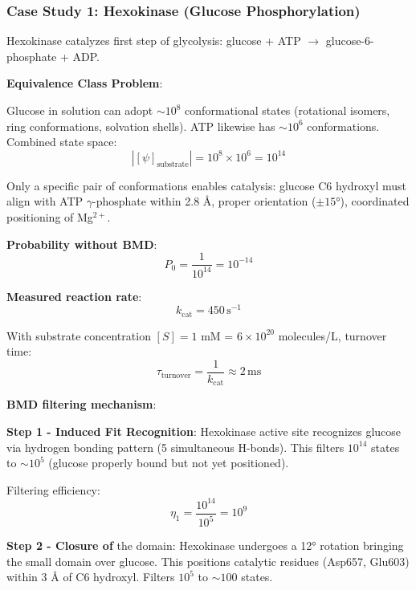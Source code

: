 \documentclass[11pt,onecolumn]{article}
\begin{document}
\subsubsection{Case Study 1: Hexokinase (Glucose Phosphorylation)}

Hexokinase catalyzes first step of glycolysis: glucose + ATP $\to$ glucose-6-phosphate + ADP.

\textbf{Equivalence Class Problem}:

Glucose in solution can adopt $\sim 10^8$ conformational states (rotational isomers, ring conformations, solvation shells). ATP likewise has $\sim 10^6$ conformations. Combined state space:
\begin{equation}
|[\psi]_{\text{substrate}}| = 10^8 \times 10^6 = 10^{14}
\end{equation}

Only a specific pair of conformations enables catalysis: glucose C6 hydroxyl must align with ATP $\gamma$-phosphate within 2.8 Å, proper orientation ($\pm 15°$), coordinated positioning of Mg$^{2+}$.

\textbf{Probability without BMD}:
\begin{equation}
P_0 = \frac{1}{10^{14}} = 10^{-14}
\end{equation}

\textbf{Measured reaction rate}:
\begin{equation}
k_{\text{cat}} = 450\,\text{s}^{-1}
\end{equation}

With substrate concentration $[S] = 1$ mM = $6 \times 10^{20}$ molecules/L, turnover time:
\begin{equation}
\tau_{\text{turnover}} = \frac{1}{k_{\text{cat}}} \approx 2\,\text{ms}
\end{equation}

\textbf{BMD filtering mechanism}:

\textbf{Step 1 - Induced Fit Recognition}: Hexokinase active site recognizes glucose via hydrogen bonding pattern (5 simultaneous H-bonds). This filters $10^{14}$ states to $\sim 10^5$ (glucose properly bound but not yet positioned).

Filtering efficiency:
\begin{equation}
\eta_1 = \frac{10^{14}}{10^5} = 10^9
\end{equation}

\textbf{Step 2 - Closure of} the domain: Hexokinase undergoes a 12° rotation bringing the small domain over glucose. This positions catalytic residues (Asp657, Glu603) within 3 Å of C6 hydroxyl. Filters $10^5$ to $\sim 100$ states.
\end{document}
